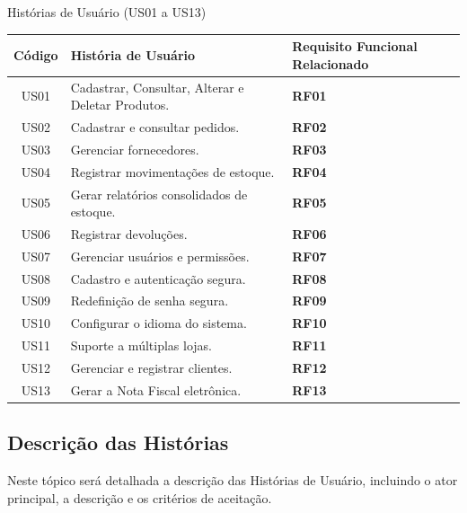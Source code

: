 \documentclass[
	12pt,				%
	openany,			%
	twoside,			%
	a4paper,			%
	english,			%
	brazil				%
	]{abntex2}
\begin{document}
\begin{quadro}[htb]
\caption{Histórias de Usuário (US01 a US13)}
\label{hist_usuarios}
\begin{tabular}{|c|p{10cm}|p{4cm}|}
\hline
\textbf{Código} & \textbf{História de Usuário} & \textbf{Requisito Funcional Relacionado} \\
\hline
US01 & Cadastrar, Consultar, Alterar e Deletar Produtos. & \textbf{RF01} \\ \hline
US02 & Cadastrar e consultar pedidos. & \textbf{RF02} \\ \hline
US03 & Gerenciar fornecedores. & \textbf{RF03} \\ \hline
US04 & Registrar movimentações de estoque. & \textbf{RF04} \\ \hline
US05 & Gerar relatórios consolidados de estoque. & \textbf{RF05} \\ \hline
US06 & Registrar devoluções. & \textbf{RF06} \\ \hline
US07 & Gerenciar usuários e permissões. & \textbf{RF07} \\ \hline
US08 & Cadastro e autenticação segura. & \textbf{RF08} \\ \hline
US09 & Redefinição de senha segura. & \textbf{RF09} \\ \hline
US10 & Configurar o idioma do sistema. & \textbf{RF10} \\ \hline
US11 & Suporte a múltiplas lojas. & \textbf{RF11} \\ \hline
US12 & Gerenciar e registrar clientes. & \textbf{RF12} \\ \hline
US13 & Gerar a Nota Fiscal eletrônica. & \textbf{RF13} \\ \hline
\hline
\end{tabular}
\end{quadro}

\FloatBarrier

\subsection{Descrição das Histórias}

Neste tópico será detalhada a descrição das Histórias de Usuário, incluindo o ator principal, a descrição e os critérios de aceitação.
\end{document}
